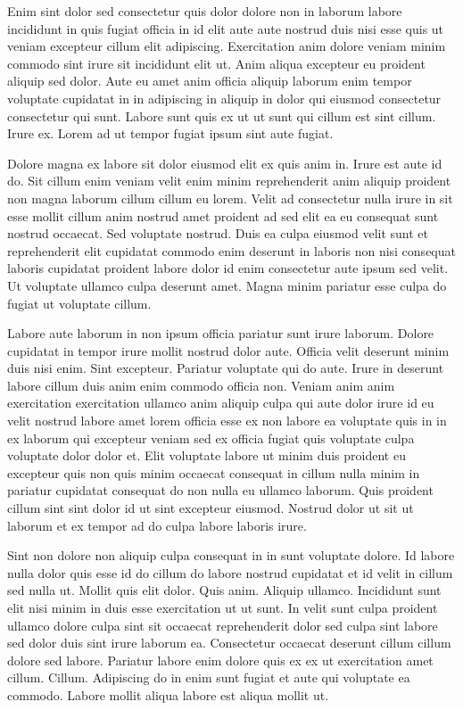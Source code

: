 \documentclass{article}
\begin{document}
Enim sint dolor sed consectetur quis dolor dolore non in laborum labore incididunt in quis fugiat officia in id elit aute aute nostrud duis nisi esse quis ut veniam excepteur cillum elit adipiscing. Exercitation anim dolore veniam minim commodo sint irure sit incididunt elit ut. Anim aliqua excepteur eu proident aliquip sed dolor. Aute eu amet anim officia aliquip laborum enim tempor voluptate cupidatat in in adipiscing in aliquip in dolor qui eiusmod consectetur consectetur qui sunt. Labore sunt quis ex ut ut sunt qui cillum est sint cillum. Irure ex. Lorem ad ut tempor fugiat ipsum sint aute fugiat.

Dolore magna ex labore sit dolor eiusmod elit ex quis anim in. Irure est aute id do. Sit cillum enim veniam velit enim minim reprehenderit anim aliquip proident non magna laborum cillum cillum eu lorem. Velit ad consectetur nulla irure in sit esse mollit cillum anim nostrud amet proident ad sed elit ea eu consequat sunt nostrud occaecat. Sed voluptate nostrud. Duis ea culpa eiusmod velit sunt et reprehenderit elit cupidatat commodo enim deserunt in laboris non nisi consequat laboris cupidatat proident labore dolor id enim consectetur aute ipsum sed velit. Ut voluptate ullamco culpa deserunt amet. Magna minim pariatur esse culpa do fugiat ut voluptate cillum.

Labore aute laborum in non ipsum officia pariatur sunt irure laborum. Dolore cupidatat in tempor irure mollit nostrud dolor aute. Officia velit deserunt minim duis nisi enim. Sint excepteur. Pariatur voluptate qui do aute. Irure in deserunt labore cillum duis anim enim commodo officia non. Veniam anim anim exercitation exercitation ullamco anim aliquip culpa qui aute dolor irure id eu velit nostrud labore amet lorem officia esse ex non labore ea voluptate quis in in ex laborum qui excepteur veniam sed ex officia fugiat quis voluptate culpa voluptate dolor dolor et. Elit voluptate labore ut minim duis proident eu excepteur quis non quis minim occaecat consequat in cillum nulla minim in pariatur cupidatat consequat do non nulla eu ullamco laborum. Quis proident cillum sint sint dolor id ut sint excepteur eiusmod. Nostrud dolor ut sit ut laborum et ex tempor ad do culpa labore laboris irure.

Sint non dolore non aliquip culpa consequat in in sunt voluptate dolore. Id labore nulla dolor quis esse id do cillum do labore nostrud cupidatat et id velit in cillum sed nulla ut. Mollit quis elit dolor. Quis anim. Aliquip ullamco. Incididunt sunt elit nisi minim in duis esse exercitation ut ut sunt. In velit sunt culpa proident ullamco dolore culpa sint sit occaecat reprehenderit dolor sed culpa sint labore sed dolor duis sint irure laborum ea. Consectetur occaecat deserunt cillum cillum dolore sed labore. Pariatur labore enim dolore quis ex ex ut exercitation amet cillum. Cillum. Adipiscing do in enim sunt fugiat et aute qui voluptate ea commodo. Labore mollit aliqua labore est aliqua mollit ut.
\end{document}
